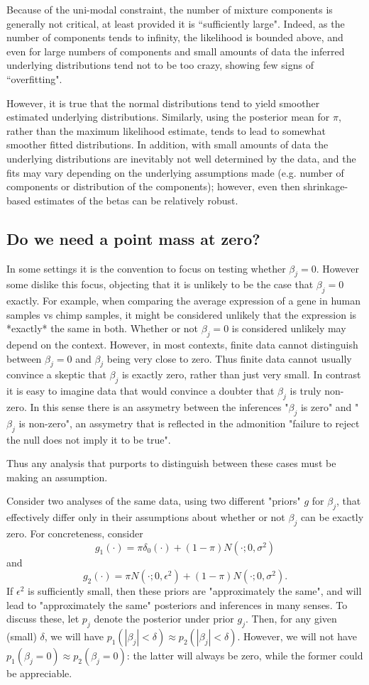 \documentclass[10pt]{article}
\begin{document}
Because of the uni-modal constraint, the number of mixture components
is generally not critical, at least provided it is ``sufficiently large". 
Indeed, as the number of components tends to infinity, the likelihood
is bounded above, and even for large numbers of components and small amounts of data the inferred underlying distributions tend not to be too crazy, showing few signs of ``overfitting". 

However, it is true that the normal distributions tend to yield smoother estimated underlying distributions. Similarly, using the posterior mean for $\pi$, rather
than the maximum likelihood estimate, tends to lead to somewhat smoother fitted distributions. In addition, with small amounts of data the underlying
distributions are inevitably not well determined by the data, and the fits may vary depending on the underlying assumptions made (e.g. number of components or distribution of the components); however, even then shrinkage-based estimates
of the betas can be relatively robust.

\subsection{Do we need a point mass at zero?}

In some settings it is the convention to focus on testing whether $\beta_j=0$. However some dislike this focus, objecting that it is unlikely to be the case that $\beta_j=0$ exactly. For example, when comparing the average expression of a gene in human samples vs chimp samples, it might be considered unlikely that the expression
is *exactly* the same in both. Whether or not $\beta_j=0$
is considered unlikely may depend on the context.
However, in most contexts, finite data cannot
distinguish between $\beta_j=0$ and $\beta_j$ being very close to zero. Thus finite data cannot usually convince a skeptic that $\beta_j$ is exactly zero, rather than just very small. In contrast it is easy to imagine data that would convince a doubter that $\beta_j$ is truly non-zero. In this sense there is an assymetry between the inferences "$\beta_j$ is zero" and "$\beta_j$ is non-zero", an assymetry that is reflected in the admonition "failure to reject the null does not imply it to be true".

Thus any analysis that purports to distinguish between these cases must be making an assumption. 

Consider two analyses of the same data, using two different "priors" $g$ for $\beta_j$, that effectively differ only in their assumptions about whether or not $\beta_j$ can be exactly zero. For concreteness, consider
\[ g_1(\cdot) = \pi \delta_0(\cdot) + (1-\pi) N(\cdot; 0,\sigma^2) \]
and
\[g_2(\cdot) = \pi N(\cdot; 0, \epsilon^2) + (1-\pi) N(\cdot; 0, \sigma^2).\]
If $\epsilon^2$ is sufficiently small, then these 
priors are "approximately the same", and will lead to "approximately the same" posteriors and inferences in many senses. To discuss these, let $p_j$ denote the posterior under prior $g_j$. Then, for any given (small) $\delta$, we will have $p_1(|\beta_j|<\delta) \approx p_2(|\beta_j|< \delta)$. However, we will not have $p_1(\beta_j=0) \approx p_2(\beta_j=0)$: the latter will always be zero, while the former could be appreciable.
\end{document}
